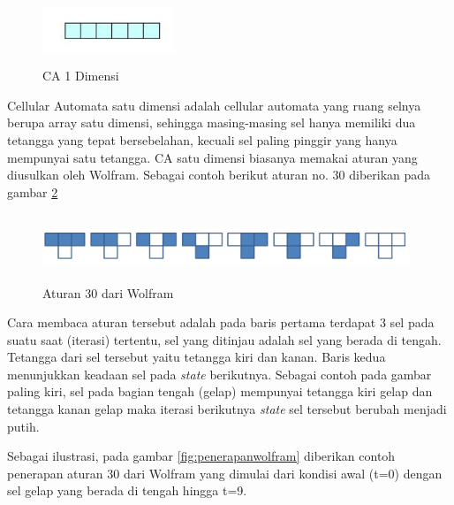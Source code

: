 \documentclass[a4paper,twoside]{article}
\begin{document}
\begin{enumerate}
\begin{enumerate}
\begin{itemize}
				\begin{figure} [H]
					\centering  
					\includegraphics[width=4cm, height=2cm]{CA1D} 
					\caption[CA 1 Dimensi]{CA 1 Dimensi} 
					\label{fig:CA1D} 
				\end{figure}
			
			Cellular Automata satu dimensi adalah cellular automata yang ruang selnya berupa array satu dimensi, sehingga masing-masing sel hanya memiliki dua tetangga yang tepat bersebelahan, kecuali sel paling pinggir yang hanya mempunyai satu tetangga. CA satu dimensi biasanya memakai aturan yang diusulkan oleh Wolfram. Sebagai contoh berikut aturan no. 30 diberikan pada gambar \ref{fig:wolfram}
			
			
			\begin{figure} [H]
					\centering  
					\includegraphics[width=11cm, height=2cm]{wolfram} 
					\caption[Aturan 30 dari Wolfram]{Aturan 30 dari Wolfram} 
					\label{fig:wolfram} 
				\end{figure}
				
				Cara membaca aturan tersebut adalah pada baris pertama terdapat 3 sel pada suatu saat (iterasi) tertentu, sel yang ditinjau adalah sel yang berada di tengah. Tetangga dari sel tersebut yaitu tetangga kiri dan kanan. Baris kedua menunjukkan keadaan sel pada \textit{state} berikutnya. Sebagai contoh pada gambar paling kiri, sel pada bagian tengah (gelap) mempunyai tetangga kiri gelap dan tetangga kanan gelap maka iterasi berikutnya \textit{state} sel tersebut berubah menjadi putih.
				
				Sebagai ilustrasi, pada gambar \ref{fig:penerapanwolfram} diberikan contoh penerapan aturan 30 dari Wolfram yang dimulai dari kondisi awal (t=0) dengan sel gelap yang berada di tengah hingga t=9.
				

\end{itemize}
\end{enumerate}
\end{enumerate}
\end{document}
